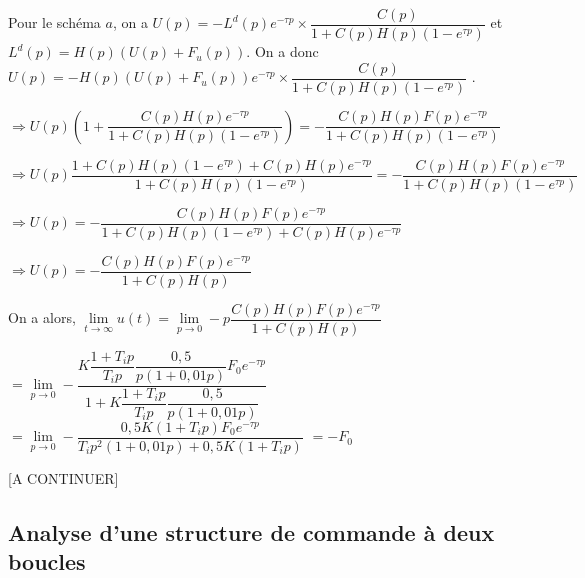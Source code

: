 \ifprof
\begin{corrige} 
Pour le schéma $a$, on a 
$U(p) =-L^d(p) e^{-\tau p} \times \dfrac{C(p)}{1+C(p)H(p)\left( 1- e^{\tau p}\right)}$ 
et $L^d(p) = H(p)\left( U(p)+F_u(p)\right)$.
On a donc 
$U(p) =-H(p)\left( U(p)+F_u(p)\right) e^{-\tau p} \times \dfrac{C(p)}{1+C(p)H(p)\left( 1- e^{\tau p}\right)}$ .

$\Rightarrow 
U(p) \left(1+  \dfrac{C(p) H(p)e^{-\tau p} }{1+C(p)H(p)\left( 1- e^{\tau p}\right)} \right)=-\dfrac{C(p) H(p) F(p) e^{-\tau p} }{1+C(p)H(p)\left( 1- e^{\tau p}\right)}$

$\Rightarrow 
U(p)   \dfrac{1+C(p)H(p)\left( 1- e^{\tau p}\right)+C(p) H(p)e^{-\tau p} }{1+C(p)H(p)\left( 1- e^{\tau p}\right)} =-\dfrac{C(p) H(p) F(p) e^{-\tau p} }{1+C(p)H(p)\left( 1- e^{\tau p}\right)}$

$\Rightarrow 
U(p)   =-\dfrac{C(p) H(p) F(p) e^{-\tau p} }{1+C(p)H(p)\left( 1- e^{\tau p}\right)+C(p) H(p)e^{-\tau p}}$


$\Rightarrow 
U(p)   =-\dfrac{C(p) H(p) F(p) e^{-\tau p} }{1+C(p)H(p)}$


On a alors, 
$\lim\limits_{t \to \infty} u(t) = \lim\limits_{p \to 0} - p \dfrac{C(p) H(p) F(p) e^{-\tau p} }{1+C(p)H(p)}$

$= \lim\limits_{p \to 0}  -\dfrac{K\dfrac{1+T_i p}{T_i p} \dfrac{0,5}{p\left(1+0,01 p \right)} F_0 e^{-\tau p} }{1+K\dfrac{1+T_i p}{T_i p}\dfrac{0,5}{p\left(1+0,01 p \right)}}$
$= \lim\limits_{p \to 0} - \dfrac{0,5K\left(1+T_i p\right)  F_0 e^{-\tau p} }{T_i p^2\left(1+0,01 p \right) +0,5K\left(1+T_i p\right)}$
$=  -  F_0$

[A CONTINUER]
\end{corrige}
\else
\fi

\subsection*{Analyse d’une structure de commande à deux boucles}

